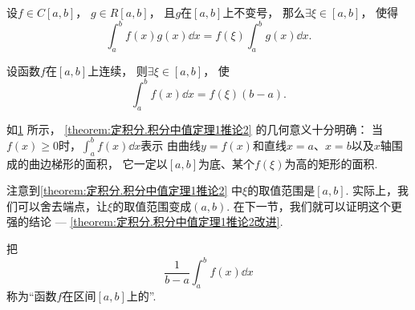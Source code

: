 \begin{corollary}\label{theorem:定积分.积分中值定理1推论1}
设\(f \in C[a,b]\)，
\(g \in R[a,b]\)，
且\(g\)在\([a,b]\)上不变号，
那么\(\exists\xi\in[a,b]\)，
使得\begin{equation}
	\int_a^b f(x) g(x) \dd{x}
	= f(\xi) \int_a^b g(x) \dd{x}.
\end{equation}
\end{corollary}

\begin{figure}[htb]
	\centering
	\caption{}
	\label{figure:定积分.积分中值定理的几何意义}
\end{figure}

\begin{corollary}\label{theorem:定积分.积分中值定理1推论2}
设函数\(f\)在\([a,b]\)上连续，
则\(\exists\xi\in[a,b]\)，
使\begin{equation}
	\int_a^b f(x) \dd{x} = f(\xi) (b-a).
\end{equation}
\end{corollary}
\begin{remark}
如\cref{figure:定积分.积分中值定理的几何意义} 所示，
\cref{theorem:定积分.积分中值定理1推论2} 的几何意义十分明确：
当\(f(x)\geq0\)时，\(\int_a^b f(x) \dd{x}\)表示
由曲线\(y=f(x)\)和直线\(x=a\)、\(x=b\)以及\(x\)轴围成的曲边梯形的面积，
它一定以\([a,b]\)为底、某个\(f(\xi)\)为高的矩形的面积.
\end{remark}
\begin{remark}
注意到\cref{theorem:定积分.积分中值定理1推论2} 中\(\xi\)的取值范围是\([a,b]\).
实际上，我们可以舍去端点，让\(\xi\)的取值范围变成\((a,b)\).
在下一节，我们就可以证明这个更强的结论 --- \cref{theorem:定积分.积分中值定理1推论2改进}.
\end{remark}
\begin{definition}
把\begin{equation}
	\frac{1}{b-a} \int_a^b f(x) \dd{x}
\end{equation}
称为“函数\(f\)在区间\([a,b]\)上的”.
\end{definition}

